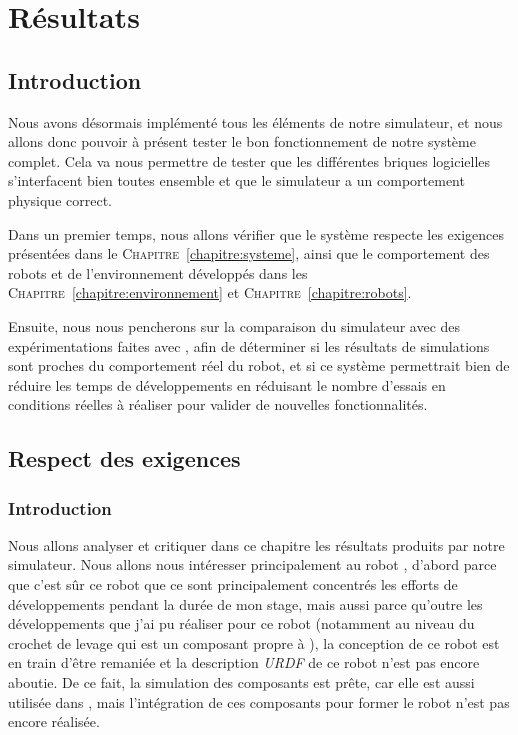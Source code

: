 \chapter{Résultats}
\label{chapter:resultats}
	
	\section{Introduction}

		Nous avons désormais implémenté tous les éléments de notre simulateur, et nous allons donc pouvoir à présent tester le bon fonctionnement de notre système complet. Cela va nous permettre de tester que les différentes briques logicielles s'interfacent bien toutes ensemble et que le simulateur a un comportement physique correct.
		
		Dans un premier temps, nous allons vérifier que le système respecte les exigences présentées dans le \textsc{Chapitre}~\ref{chapitre:systeme}, ainsi que le comportement des robots et de l'environnement développés dans les \textsc{Chapitre}~\ref{chapitre:environnement} et \textsc{Chapitre}~\ref{chapitre:robots}.

		Ensuite, nous nous pencherons sur la comparaison du simulateur avec des expérimentations faites avec \argos{}, afin de déterminer si les résultats de simulations sont proches du comportement réel du robot, et si ce système permettrait bien de réduire les temps de développements en réduisant le nombre d'essais en conditions réelles à réaliser pour valider de nouvelles fonctionnalités.

	\section{Respect des exigences}

		\subsection{Introduction}

			Nous allons analyser et critiquer dans ce chapitre les résultats produits par notre simulateur. Nous allons nous intéresser principalement au robot \argos{}, d'abord parce que c'est sûr ce robot que ce sont principalement concentrés les efforts de développements pendant la durée de mon stage, mais aussi parce qu'outre les développements que j'ai pu réaliser pour ce robot (notamment au niveau du crochet de levage qui est un composant propre à \atoll{}), la conception de ce robot est en train d'être remaniée et la description \textit{URDF} de ce robot n'est pas encore aboutie. De ce fait, la simulation des composants est prête, car elle est aussi utilisée dans \argos{}, mais l'intégration de ces composants pour former le robot \atoll{} n'est pas encore réalisée.

